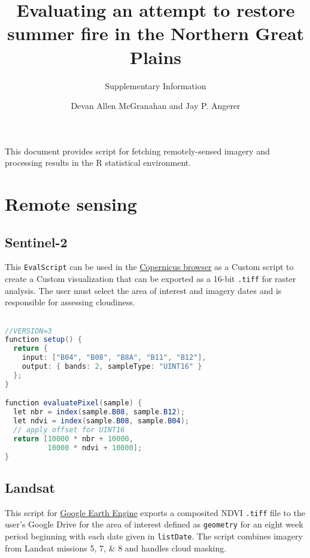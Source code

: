 \documentclass[
]{article}
\title{Evaluating an attempt to restore summer fire in the Northern
Great Plains}
\subtitle{Supplementary Information}
\author{Devan Allen McGranahan and Jay P. Angerer}
\date{}
\begin{document}
\maketitle

This document provides script for fetching remotely-sensed imagery and
processing results in the \textsf{R} statistical environment.

\section{Remote sensing}\label{remote-sensing}

\subsection{Sentinel-2}\label{sentinel-2}

This \texttt{EvalScript} can be used in the
\href{https://browser.dataspace.copernicus.eu/}{Copernicus browser} as a
Custom script to create a Custom visualization that can be exported as a
16-bit \texttt{.tiff} for raster analysis. The user must select the area
of interest and imagery dates and is responsible for assessing
cloudiness.

\begin{lstlisting}[language=Java]

//VERSION=3
function setup() {
  return {
    input: ["B04", "B08", "B8A", "B11", "B12"],
    output: { bands: 2, sampleType: "UINT16" }
  };
}

function evaluatePixel(sample) {
  let nbr = index(sample.B08, sample.B12);
  let ndvi = index(sample.B08, sample.B04);
  // apply offset for UINT16 
  return [10000 * nbr + 10000, 
          10000 * ndvi + 10000]; 
}
\end{lstlisting}

\clearpage

\subsection{Landsat}\label{landsat}

This script for \href{https://code.earthengine.google.com/}{Google Earth
Engine} exports a composited NDVI \texttt{.tiff} file to the user's
Google Drive for the area of interest defined as \texttt{geometry} for
an eight week period beginning with each date given in
\texttt{listDate}. The script combines imagery from Landsat missions 5,
7, \& 8 and handles cloud masking.
\end{document}
